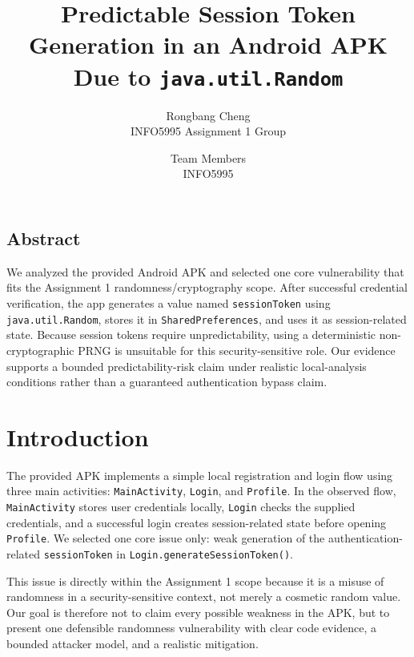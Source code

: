 \documentclass[letterpaper,twocolumn,10pt]{article}
\begin{document}
\date{}

\title{\Large \bf Predictable Session Token Generation in an Android APK Due to \texttt{java.util.Random}}

\author{
{\rm Rongbang Cheng}\\
INFO5995 Assignment 1 Group
\and
{\rm Team Members}\\
INFO5995
}

\maketitle
\thispagestyle{empty}

\subsection*{Abstract}
We analyzed the provided Android APK and selected one core vulnerability that fits the Assignment 1 randomness/cryptography scope. After successful credential verification, the app generates a value named \texttt{sessionToken} using \texttt{java.util.Random}, stores it in \texttt{SharedPreferences}, and uses it as session-related state. Because session tokens require unpredictability, using a deterministic non-cryptographic PRNG is unsuitable for this security-sensitive role. Our evidence supports a bounded predictability-risk claim under realistic local-analysis conditions rather than a guaranteed authentication bypass claim.

\section{Introduction}

The provided APK implements a simple local registration and login flow using three main activities: \texttt{MainActivity}, \texttt{Login}, and \texttt{Profile}. In the observed flow, \texttt{MainActivity} stores user credentials locally, \texttt{Login} checks the supplied credentials, and a successful login creates session-related state before opening \texttt{Profile}. We selected one core issue only: weak generation of the authentication-related \texttt{sessionToken} in \texttt{Login.generateSessionToken()}.

This issue is directly within the Assignment 1 scope because it is a misuse of randomness in a security-sensitive context, not merely a cosmetic random value. Our goal is therefore not to claim every possible weakness in the APK, but to present one defensible randomness vulnerability with clear code evidence, a bounded attacker model, and a realistic mitigation.
\end{document}
